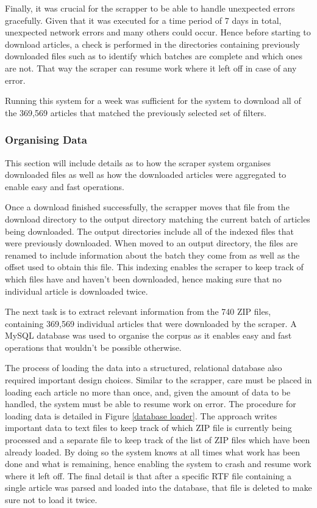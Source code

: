 Finally, it was crucial for the scrapper to be able to handle unexpected errors gracefully. Given that it was executed for a time period of 7 days in total, unexpected network errors and many others could occur. Hence before starting to download articles, a check is performed in the directories containing previously downloaded files such as to identify which batches are complete and which ones are not. That way the scraper can resume work where it left off in case of any error.

Running this system for a week was sufficient for the system to download all of the 369,569 articles that matched the previously selected set of filters.

\subsubsection{Organising Data}

This section will include details as to how the scraper system organises downloaded files as well as how the downloaded articles were aggregated to enable easy and fast operations.

Once a download finished successfully, the scrapper moves that file from the download directory to the output directory matching the current batch of articles being downloaded. The output directories include all of the indexed files that were previously downloaded. When moved to an output directory, the files are renamed to include information about the batch they come from as well as the offset used to obtain this file. This indexing enables the scraper to keep track of which files have and haven't been downloaded, hence making sure that no individual article is downloaded twice.

The next task is to extract relevant information from the 740 ZIP files, containing 369,569 individual articles that were downloaded by the scraper. A MySQL database was used to organise the corpus as it enables easy and fast operations that wouldn't be possible otherwise.

The process of loading the data into a structured, relational database also required important design choices. Similar to the scrapper, care must be placed in loading each article no more than once, and, given the amount of data to be handled, the system must be able to resume work on error. The procedure for loading data is detailed in Figure \ref{database loader}. The approach writes important data to text files to keep track of which ZIP file is currently being processed and a separate file to keep track of the list of ZIP files which have been already loaded. By doing so the system knows at all times what work has been done and what is remaining, hence enabling the system to crash and resume work where it left off. The final detail is that after a specific RTF file containing a single article was parsed and loaded into the database, that file is deleted to make sure not to load it twice.

